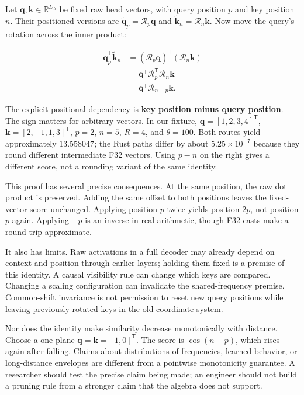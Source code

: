 \documentclass[
  10pt,
]{article}
\begin{document}
Let \(\mathbf{q},\mathbf{k}\in\mathbb{R}^{D_h}\) be fixed raw head
vectors, with query position \(p\) and key position \(n\). Their
positioned versions are
\(\widetilde{\mathbf{q}}_p=\mathcal{R}_p\mathbf{q}\) and
\(\widetilde{\mathbf{k}}_n=\mathcal{R}_n\mathbf{k}\). Now move the
query's rotation across the inner product:

\[
\begin{aligned}
\widetilde{\mathbf{q}}_p^{\mathsf T}\widetilde{\mathbf{k}}_n
&=(\mathcal{R}_p\mathbf{q})^{\mathsf T}
  (\mathcal{R}_n\mathbf{k})\\
&=\mathbf{q}^{\mathsf T}\mathcal{R}_p^{\mathsf T}
  \mathcal{R}_n\mathbf{k}\\
&=\mathbf{q}^{\mathsf T}\mathcal{R}_{n-p}\mathbf{k}.
\end{aligned}
\]

The explicit positional dependency is \textbf{key position minus query
position}. The sign matters for arbitrary vectors. In our fixture,
\(\mathbf{q}=[1,2,3,4]^{\mathsf T}\),
\(\mathbf{k}=[2,-1,1,3]^{\mathsf T}\), \(p=2\), \(n=5\), \(R=4\), and
\(\theta=100\). Both routes yield approximately \(13.558047\); the Rust
paths differ by about \(5.25\times10^{-7}\) because they round different
intermediate F32 vectors. Using \(p-n\) on the right gives a different
score, not a rounding variant of the same identity.

This proof has several precise consequences. At the same position, the
raw dot product is preserved. Adding the same offset to both positions
leaves the fixed-vector score unchanged. Applying position \(p\) twice
yields position \(2p\), not position \(p\) again. Applying \(-p\) is an
inverse in real arithmetic, though F32 casts make a round trip
approximate.

It also has limits. Raw activations in a full decoder may already depend
on context and position through earlier layers; holding them fixed is a
premise of this identity. A causal visibility rule can change which keys
are compared. Changing a scaling configuration can invalidate the
shared-frequency premise. Common-shift invariance is not permission to
reset new query positions while leaving previously rotated keys in the
old coordinate system.

Nor does the identity make similarity decrease monotonically with
distance. Choose a one-plane
\(\mathbf{q}=\mathbf{k}=[1,0]^{\mathsf T}\). The score is \(\cos(n-p)\),
which rises again after falling. Claims about distributions of
frequencies, learned behavior, or long-distance envelopes are different
from a pointwise monotonicity guarantee. A researcher should test the
precise claim being made; an engineer should not build a pruning rule
from a stronger claim that the algebra does not support.
\end{document}

